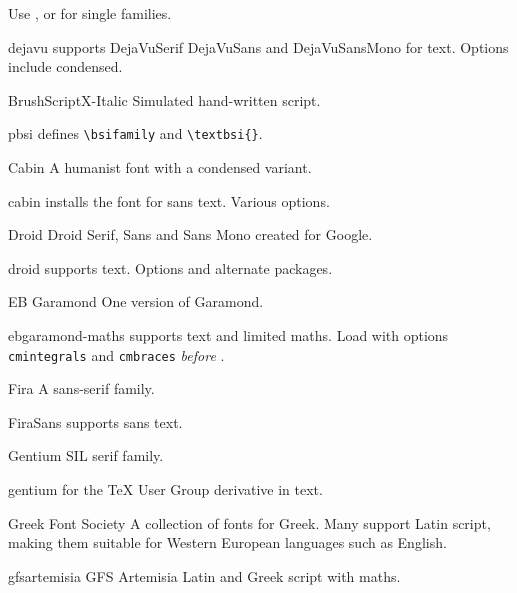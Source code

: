 \documentclass[a4paper,welsh,british,twocolumn]{article}
\begin{document}
\begin{fontopts}
\begin{pkgdescription}
	Use ,  or  for single families.
	\item[dejavu] supports DejaVuSerif DejaVuSans and De\-ja\-Vu\-Sans\-Mono for text.
	Options include condensed.
  \end{pkgdescription}
  \item[BrushScriptX-Italic] Simulated hand-written script.
  \begin{pkgdescription}
	\item[pbsi] defines \verb|\bsifamily| and \verb|\textbsi{}|.
  \end{pkgdescription}
  \item[Cabin] A humanist font with a condensed variant.
  \begin{pkgdescription}
    \item[cabin] installs the font for sans text.
	Various options.
  \end{pkgdescription}
  \item[Droid] Droid Serif, Sans and Sans Mono created for Google.
  \begin{pkgdescription}
    \item[droid] supports text.
	Options and alternate packages.
  \end{pkgdescription}
  \item[EB Garamond] One version of Garamond.
  \begin{pkgdescription}
    \item[ebgaramond-maths] supports text and limited maths.
	Load  with options \verb|cmintegrals| and \verb|cmbraces| \emph{before} .
  \end{pkgdescription}
  \item[Fira] A sans-serif family.
  \begin{pkgdescription}
    \item[FiraSans] supports sans text.
  \end{pkgdescription}
  \item[Gentium] SIL serif family.
  \begin{pkgdescription}
	\item[gentium] for the \TeX{} User Group derivative in text.
  \end{pkgdescription}
  \item[Greek Font Society] A collection of fonts for Greek.
  Many support Latin script, making them suitable for Western European languages such as English.
  \begin{pkgdescription}
	\item[gfsartemisia] GFS Artemisia Latin and Greek script with  maths.

\end{pkgdescription}
\end{fontopts}
\end{document}
